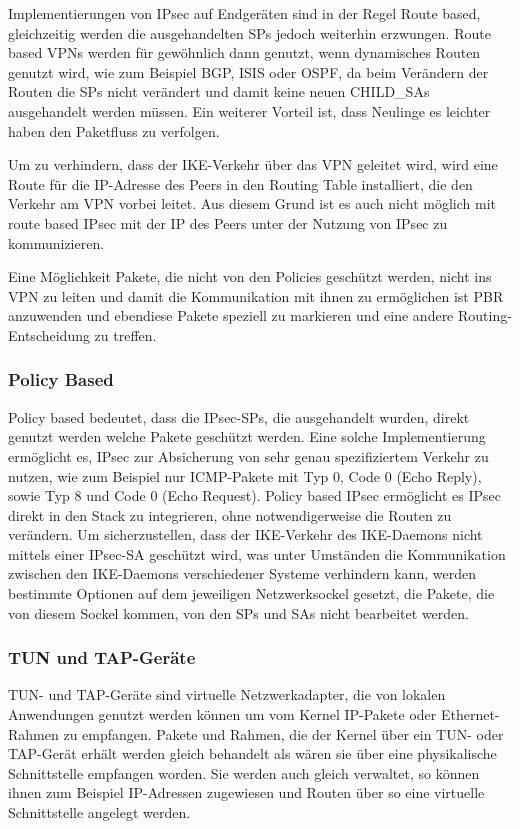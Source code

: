 Implementierungen von IPsec auf Endgeräten sind in der Regel Route based, gleichzeitig werden
die ausgehandelten \acp{SP} jedoch weiterhin erzwungen.
Route based \acp{VPN} werden für gewöhnlich dann genutzt, wenn dynamisches Routen genutzt wird,
wie zum Beispiel \ac{BGP}, \ac{ISIS} oder \ac{OSPF}, da beim Verändern der Routen die \acp{SP} nicht verändert
und damit keine neuen CHILD\_SAs ausgehandelt werden müssen. Ein weiterer Vorteil ist, dass Neulinge es leichter haben
den Paketfluss zu verfolgen.

Um zu verhindern, dass der \ac{IKE}-Verkehr über das \ac{VPN} geleitet wird, wird
eine Route für die \ac{IP}-Adresse des Peers in den Routing Table installiert,
die den Verkehr am \ac{VPN} vorbei leitet. Aus diesem Grund ist es auch nicht möglich
mit route based \ac{IPsec} mit der \ac{IP} des Peers unter der Nutzung von \ac{IPsec} zu kommunizieren.

Eine Möglichkeit Pakete, die nicht von den Policies geschützt werden, nicht ins \ac{VPN} zu leiten und
damit die Kommunikation mit ihnen zu ermöglichen ist \ac{PBR} anzuwenden und ebendiese Pakete
speziell zu markieren und eine andere Routing-Entscheidung zu treffen.

\subsubsection{Policy Based}
\label{subsec:policybased}
Policy based bedeutet, dass die \ac{IPsec}-\acp{SP}, die ausgehandelt wurden, direkt genutzt werden welche Pakete geschützt werden.
Eine solche Implementierung ermöglicht es, \ac{IPsec} zur Absicherung von sehr genau spezifiziertem
Verkehr zu nutzen, wie zum Beispiel nur \ac{ICMP}-Pakete mit Typ 0, Code 0 (Echo Reply), sowie Typ 8 und Code 0 (Echo Request).
Policy based \ac{IPsec} ermöglicht es \ac{IPsec} direkt in den Stack zu integrieren, ohne notwendigerweise die Routen zu verändern.
Um sicherzustellen, dass der \ac{IKE}-Verkehr des \ac{IKE}-Daemons nicht mittels einer \ac{IPsec}-\ac{SA} geschützt wird, was
unter Umständen die Kommunikation zwischen den \ac{IKE}-Daemons verschiedener Systeme verhindern kann, werden bestimmte
Optionen auf dem jeweiligen Netzwerksockel gesetzt, die Pakete, die von diesem Sockel kommen, von den \acp{SP} und \acp{SA}
nicht bearbeitet werden.



\subsubsection{TUN und TAP-Geräte}
TUN- und TAP-Geräte sind virtuelle Netzwerkadapter, die von lokalen Anwendungen
genutzt werden können um vom Kernel \ac{IP}-Pakete oder Ethernet-Rahmen zu empfangen.
Pakete und Rahmen, die der Kernel über ein TUN- oder TAP-Gerät erhält
werden gleich behandelt als wären sie über eine physikalische Schnittstelle empfangen worden.
Sie werden auch gleich verwaltet, so können ihnen zum Beispiel \ac{IP}-Adressen zugewiesen
und Routen über so eine virtuelle Schnittstelle angelegt werden.

